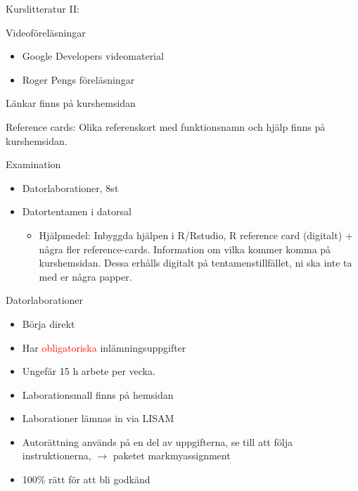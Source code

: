\documentclass[
  10pt,
  ignorenonframetext,
]{beamer}
\providecommand{\tightlist}{%
  \setlength{\itemsep}{0pt}\setlength{\parskip}{0pt}}
\begin{document}

\begin{frame}{Kurslitteratur II:}
\protect\hypertarget{kurslitteratur-ii}{}
\begin{block}{Videoföreläsningar}
\protect\hypertarget{videofuxf6reluxe4sningar}{}
\begin{itemize}
\tightlist
\item
  Google Developers videomaterial
\item
  Roger Pengs föreläsningar
\end{itemize}

Länkar finns på kurshemsidan
\end{block}

\begin{block}{Reference cards:}
\protect\hypertarget{reference-cards}{}
Olika referenskort med funktionsnamn och hjälp finns på kurshemsidan.
\end{block}
\end{frame}


\begin{frame}{Examination}
\protect\hypertarget{examination}{}
\begin{itemize}
\tightlist
\item
  Datorlaborationer, 8st
\item
  Datortentamen i datorsal

  \begin{itemize}
  \tightlist
  \item
    Hjälpmedel: Inbyggda hjälpen i R/Rstudio, R reference card (digitalt) + några fler reference-cards. Information om
    vilka kommer komma på kurshemsidan. Dessa erhålls digitalt på
    tentamenstillfället, ni ska inte ta med er några papper.
  \end{itemize}
\end{itemize}
\end{frame}


\begin{frame}{Datorlaborationer}
\protect\hypertarget{datorlaborationer}{}
\begin{itemize}
\tightlist
\item
  Börja direkt
\item
  Har \textcolor{red}{obligatoriska} inlämningsuppgifter
\item
  Ungefär 15 h arbete per vecka.
\item
  Laborationsmall finns på hemsidan
\item
  Laborationer lämnas in via LISAM
\item
  Autorättning används på en del av uppgifterna, se till att följa
  instruktionerna, $\rightarrow$ paketet markmyassignment
\item
  100\% rätt för att bli godkänd
\end{itemize}
\end{frame}
\end{document}
